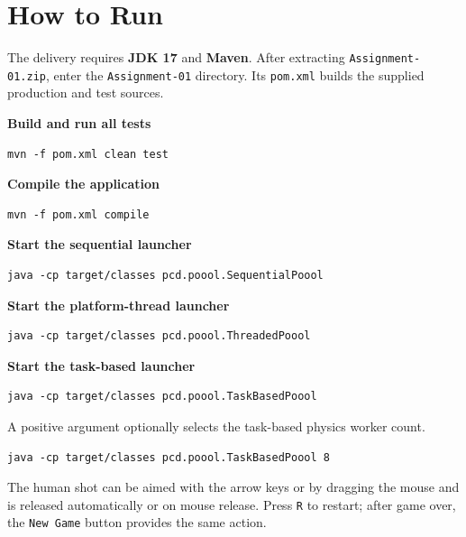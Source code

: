 \clearpage
\section{How to Run}

The delivery requires \textbf{JDK 17} and \textbf{Maven}. After extracting
\texttt{Assignment-01.zip}, enter the \texttt{Assignment-01} directory. Its
\texttt{pom.xml} builds the supplied production and test sources.

\textbf{Build and run all tests}
\begin{verbatim}
mvn -f pom.xml clean test
\end{verbatim}

\textbf{Compile the application}
\begin{verbatim}
mvn -f pom.xml compile
\end{verbatim}

\textbf{Start the sequential launcher}
\begin{verbatim}
java -cp target/classes pcd.poool.SequentialPoool
\end{verbatim}

\textbf{Start the platform-thread launcher}
\begin{verbatim}
java -cp target/classes pcd.poool.ThreadedPoool
\end{verbatim}

\textbf{Start the task-based launcher}
\begin{verbatim}
java -cp target/classes pcd.poool.TaskBasedPoool
\end{verbatim}

A positive argument optionally selects the task-based physics worker count.
\begin{verbatim}
java -cp target/classes pcd.poool.TaskBasedPoool 8
\end{verbatim}

The human shot can be aimed with the arrow keys or by dragging the mouse and is
released automatically or on mouse release. Press \texttt{R} to restart; after
game over, the \texttt{New Game} button provides the same action.
